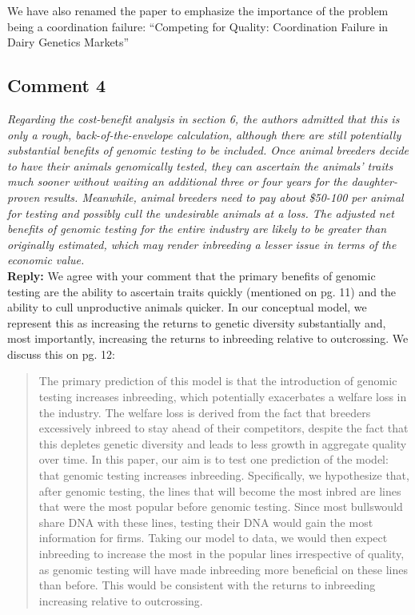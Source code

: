 \documentclass[12pt,letterpaper]{article}
\begin{document}
We have also renamed the paper to emphasize the importance of the problem being a coordination failure: ``Competing for Quality: Coordination Failure in Dairy Genetics Markets''
\subsection*{Comment 4}
{\it Regarding the cost-benefit analysis in section 6, the authors admitted that this is only a rough, back-of-the-envelope calculation, although there are still potentially substantial benefits of genomic testing to be included. Once animal breeders decide to have their animals genomically tested, they can ascertain the animals’ traits much sooner without
waiting an additional three or four years for the daughter-proven results. Meanwhile, animal breeders need to pay about \$50-100 per animal for testing and possibly cull the undesirable animals at a loss. The adjusted net benefits of genomic testing for the entire industry are likely to be greater than originally estimated, which may render inbreeding a lesser issue in terms of the economic value.} \\

\textbf{Reply:} We agree with your comment that the primary benefits of genomic testing are the ability to ascertain traits quickly (mentioned on pg. 11) and the ability to cull unproductive animals quicker. In our conceptual model, we represent this as increasing the returns to genetic diversity substantially and, most importantly, increasing the returns to inbreeding relative to outcrossing. We discuss this on pg. 12:

\begin{quote}
    The primary prediction of this model is that the introduction of genomic testing increases inbreeding, which potentially exacerbates a welfare loss in the industry. The welfare loss is derived from the fact that breeders excessively inbreed to stay ahead of their competitors, despite the fact that this depletes genetic diversity and leads to less growth in aggregate quality over time. In this paper, our aim is to test one prediction of the model: that genomic testing increases inbreeding. Specifically, we hypothesize that, after genomic testing, the lines that will become the most inbred are lines that were the most popular before genomic testing. Since most bullswould share DNA with these lines, testing their DNA would gain the most information for firms. Taking our model to data, we would then expect inbreeding to increase the most in the popular lines irrespective of quality, as genomic testing will have made inbreeding more beneficial on these lines than before. This would be consistent with the returns to inbreeding increasing relative to outcrossing.
\end{quote}
\end{document}
